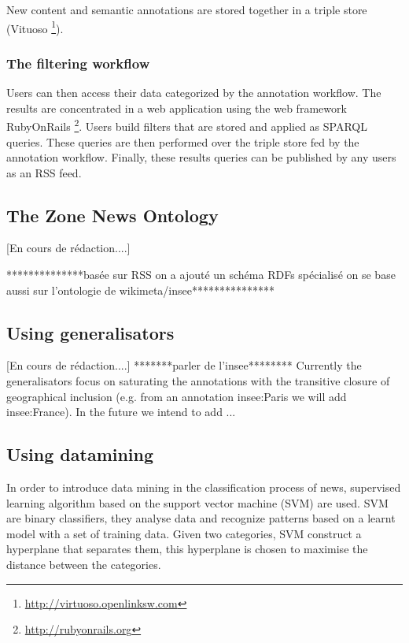 \documentclass{llncs}
\begin{document}
New content and semantic annotations are stored together in a triple store (Vituoso \footnote{\url{http://virtuoso.openlinksw.com}}). 

\subsubsection{The filtering workflow}
Users can then access their data categorized by the annotation workflow. The results are concentrated in a web application using the web framework RubyOnRails \footnote{\url{http://rubyonrails.org}}. Users build filters that are stored and applied as SPARQL queries. These queries are then performed over the triple store fed by the annotation workflow. Finally, these results queries can be published by any users as an RSS feed.

%
\subsection{The Zone News Ontology}
%
[En cours de rédaction....]


**************basée sur RSS
on a ajouté un schéma RDFs spécialisé
on se base aussi sur l'ontologie de wikimeta/insee***************
%

%
\subsection{Using generalisators}
[En cours de rédaction....]
*******parler de l'insee********
Currently the generalisators focus on saturating the annotations with the transitive closure of geographical inclusion (e.g. from an annotation insee:Paris we will add insee:France). 
In the future we intend to add ...
 

%
\subsection{Using datamining}

In order to introduce data mining in the classification process of news, supervised learning algorithm based on the support vector machine (SVM) are used. SVM are binary classifiers, they analyse data and recognize patterns based on a learnt model with a set of training data. Given two categories, SVM construct a hyperplane that separates them, this hyperplane is chosen to maximise the distance between the categories.
\end{document}
